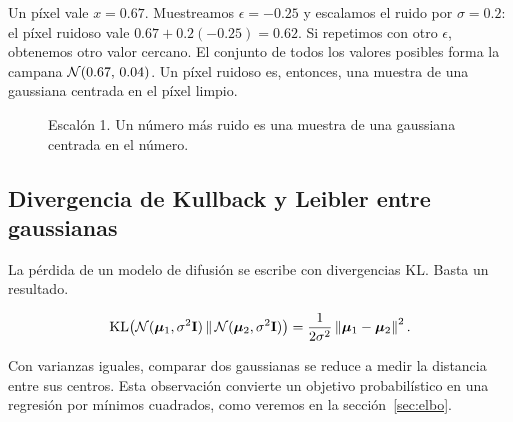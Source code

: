 \documentclass[11pt,letterpaper,oneside]{report}
\newcommand{\Ib}{\mathbf{I}}
\begin{document}
\begin{ejemplo}
Un píxel vale $x=0.67$. Muestreamos $\epsilon=-0.25$ y escalamos el ruido por $\sigma=0.2$: el píxel ruidoso vale $0.67+0.2(-0.25)=0.62$. Si repetimos con otro $\epsilon$, obtenemos otro valor cercano. El conjunto de todos los valores posibles forma la campana $\mathcal{N}(0.67,\,0.04)$. Un píxel ruidoso es, entonces, una muestra de una gaussiana centrada en el píxel limpio.
\end{ejemplo}

\begin{figure}[H]
\centering
{}
\caption{Escalón 1. Un número más ruido es una muestra de una gaussiana centrada en el número.}
\end{figure}

\subsection{Divergencia de Kullback y Leibler entre gaussianas}

La pérdida de un modelo de difusión se escribe con divergencias KL. Basta un resultado.

\begin{teorema}\label{res:kl}
\[
\KL\!\big(\Normal(\boldsymbol\mu_1,\sigma^2\Ib)\,\Vert\,\Normal(\boldsymbol\mu_2,\sigma^2\Ib)\big)=\frac{1}{2\sigma^2}\norm{\boldsymbol\mu_1-\boldsymbol\mu_2}^2 .
\]
\end{teorema}

Con varianzas iguales, comparar dos gaussianas se reduce a medir la distancia entre sus centros. Esta observación convierte un objetivo probabilístico en una regresión por mínimos cuadrados, como veremos en la sección~\ref{sec:elbo}.
\end{document}
